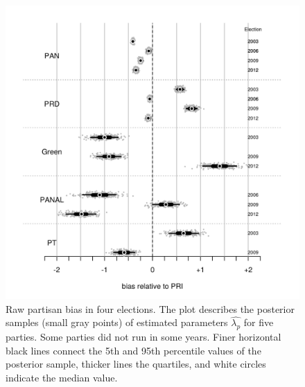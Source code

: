 \documentclass[letter,12pt]{article}
\newcommand{\mc}{\multicolumn}
\begin{document}
\begin{figure}
\begin{center}
    \includegraphics[width=.9\columnwidth]{bias200612d0R.pdf} 
  \caption{Raw partisan bias in four elections. The plot describes the posterior samples (small gray points) of estimated parameters $\hat{\lambda_p}$ for five parties. Some parties did not run in some years. Finer horizontal black lines connect the 5th and 95th percentile values of the posterior sample, thicker lines the quartiles, and white circles indicate the median value.}\label{F:posterior_s0s3}
\end{center}
\end{figure}
\end{document}
